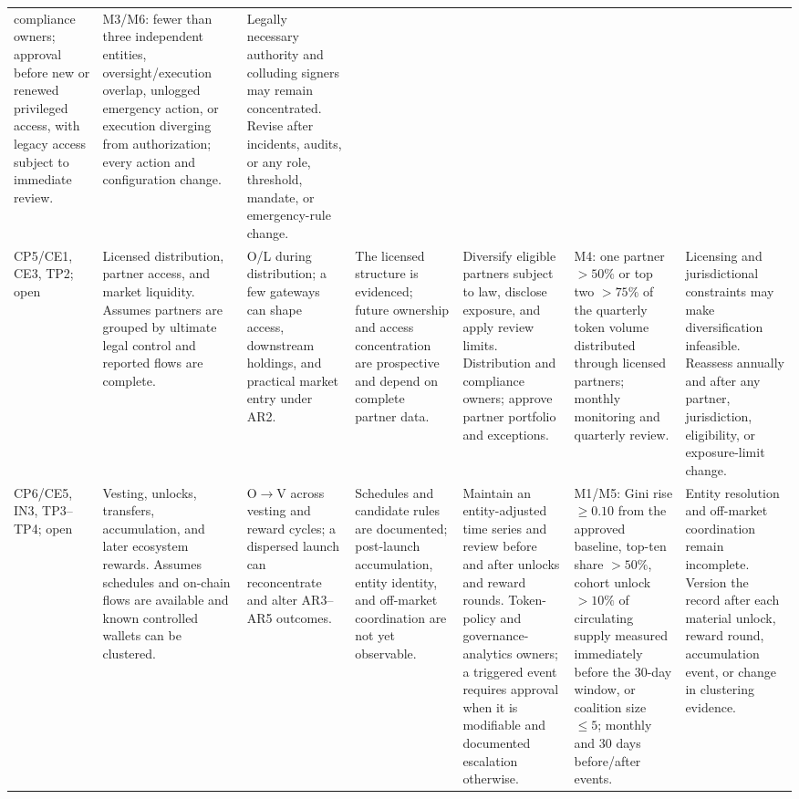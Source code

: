 \documentclass[10pt]{article}
\begin{document}
\begin{landscape}
\begin{table}[H]
\begin{tabularx}{\linewidth}{@{}p{.065\linewidth}p{.125\linewidth}p{.165\linewidth}p{.135\linewidth}p{.16\linewidth}p{.15\linewidth}Y@{}}
compliance owners; approval before new or renewed privileged access, with
legacy access subject to immediate review. & M3/M6:
fewer than three independent entities, oversight/execution overlap, unlogged
emergency action, or execution diverging from authorization; every action and
configuration change. & Legally necessary authority and colluding signers may
remain concentrated. Revise after incidents, audits, or any role, threshold,
mandate, or emergency-rule change. \\
CP5/CE1, CE3, TP2; open & Licensed distribution,
partner access, and market liquidity. Assumes partners are grouped by ultimate
legal control and reported flows are complete. & O/L during distribution; a few
gateways can shape access, downstream holdings, and practical market entry
under AR2. & The licensed structure is evidenced; future ownership and access
concentration are prospective and depend on complete partner data. & Diversify
eligible partners subject to law, disclose exposure, and apply review limits.
Distribution and compliance owners; approve partner portfolio and exceptions. &
M4: one partner $>50\%$ or top two $>75\%$ of the quarterly token volume
distributed through licensed partners; monthly
monitoring and quarterly review. & Licensing and jurisdictional constraints may
make diversification infeasible. Reassess annually and after any partner,
jurisdiction, eligibility, or exposure-limit change. \\
CP6/CE5, IN3, TP3--TP4; open & Vesting, unlocks,
transfers, accumulation, and later ecosystem rewards. Assumes schedules and
on-chain flows are available and known controlled wallets can be clustered. &
O$\rightarrow$V across vesting and reward cycles; a dispersed launch can
reconcentrate and alter AR3--AR5 outcomes. & Schedules and candidate rules are
documented; post-launch accumulation, entity identity, and off-market
coordination are not yet observable. & Maintain an entity-adjusted time series
and review before and after unlocks and reward rounds. Token-policy and
governance-analytics owners; a triggered event requires approval when it is
modifiable and documented escalation otherwise. &
M1/M5: Gini rise $\geq0.10$ from the approved baseline, top-ten share $>50\%$,
cohort unlock $>10\%$ of circulating supply measured immediately before the
30-day window, or coalition size $\leq5$; monthly and 30 days before/after events. &
Entity resolution and off-market coordination remain incomplete. Version the
record after each material unlock, reward round, accumulation event, or change
in clustering evidence. \\
\bottomrule
\end{tabularx}
\end{table}
\end{landscape}
\end{document}
